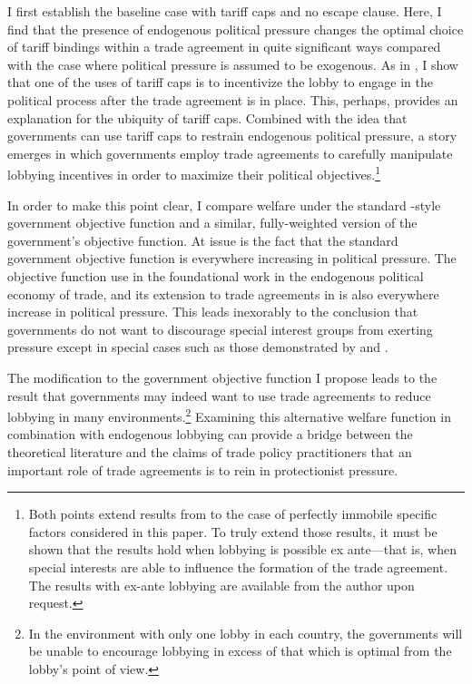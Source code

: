 I first establish the baseline case with tariff caps and no escape clause. Here, I find that the presence of endogenous political pressure changes the optimal choice of tariff bindings within a trade agreement in quite significant ways compared with the case where political pressure is assumed to be exogenous. As in \Textcite{mrc2007}, I show that one of the uses of tariff caps is to incentivize the lobby to engage in the political process after the trade agreement is in place. This, perhaps, provides an explanation for the ubiquity of tariff caps. Combined with the idea that governments can use tariff caps to restrain endogenous political pressure, a story emerges in which governments employ trade agreements to carefully manipulate lobbying incentives in order to maximize their political objectives.\footnote{Both points extend results from \Textcite{mrc2007} to the case of perfectly immobile specific factors considered in this paper. To truly extend those results, it must be shown that the results hold when lobbying is possible ex ante---that is, when special interests are able to influence the formation of the trade agreement. The results with ex-ante lobbying are available from the author upon request.}

In order to make this point clear, I compare welfare under the standard \Textcite{baldwin}-style government objective function and a similar, fully-weighted version of the government's objective function. At issue is the fact that the standard government objective function is everywhere increasing in political pressure. The objective function use in the foundational work in the endogenous political economy of trade, \Textcite{gh94} and its extension to trade agreements in \Textcite{gh95} is also everywhere increase in political pressure. This leads inexorably to the conclusion that governments do not want to discourage special interest groups from exerting pressure except in special cases such as those demonstrated by \Textcite{mrc2007} and \Textcite{mitra}.

The modification to the government objective function I propose leads to the result that governments may indeed want to use trade agreements to reduce lobbying in many environments.\footnote{In the environment with only one lobby in each country, the governments will be unable to encourage lobbying in excess of that which is optimal from the lobby's point of view.} Examining this alternative welfare function in combination with endogenous lobbying can provide a bridge between the theoretical literature and the claims of trade policy practitioners that an important role of trade agreements is to rein in protectionist pressure.

